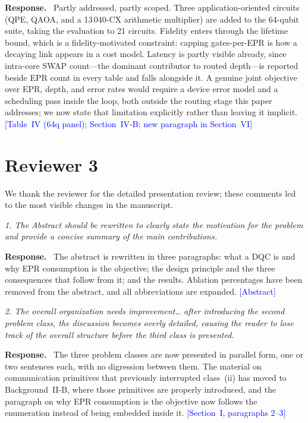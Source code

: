 \documentclass[11pt]{article}
\newenvironment{comment}{\medskip\noindent\itshape}{\par}
\newcommand{\response}{\smallskip\noindent\textbf{Response.}\ }
\newcommand{\where}[1]{\textcolor{blue}{[#1]}}
\begin{document}
\response
Partly addressed, partly scoped.  Three application-oriented circuits
(QPE, QAOA, and a 13\,040-CX arithmetic multiplier) are added to the
64-qubit suite, taking the evaluation to 21 circuits.  Fidelity enters
through the lifetime bound, which is a fidelity-motivated constraint:
capping gates-per-EPR is how a decaying link appears in a cost model.
Latency is partly visible already, since intra-core SWAP count---the
dominant contributor to routed depth---is reported beside EPR count in
every table and falls alongside it.  A genuine joint objective over
EPR, depth, and error rates would require a device error model and a
scheduling pass inside the loop, both outside the routing stage this
paper addresses; we now state that limitation explicitly rather than
leaving it implicit.
\where{Table~IV (64q panel); Section~IV-B; new paragraph in Section~VI}

\section*{Reviewer 3}

We thank the reviewer for the detailed presentation review; these
comments led to the most visible changes in the manuscript.

\begin{comment}
1. The Abstract should be rewritten to clearly state the motivation for
the problem and provide a concise summary of the main contributions.
\end{comment}

\response
The abstract is rewritten in three paragraphs: what a DQC is and why
EPR consumption is the objective; the design principle and the three
consequences that follow from it; and the results.  Ablation
percentages have been removed from the abstract, and all abbreviations
are expanded.
\where{Abstract}

\begin{comment}
2. The overall organization needs improvement\ldots{} after introducing
the second problem class, the discussion becomes overly detailed,
causing the reader to lose track of the overall structure before the
third class is presented.
\end{comment}

\response
The three problem classes are now presented in parallel form, one or
two sentences each, with no digression between them.  The material on
communication primitives that previously interrupted class~(ii) has
moved to Background~II-B, where those primitives are properly
introduced, and the paragraph on why EPR consumption is the objective
now follows the enumeration instead of being embedded inside it.
\where{Section~I, paragraphs 2--3}
\end{document}
